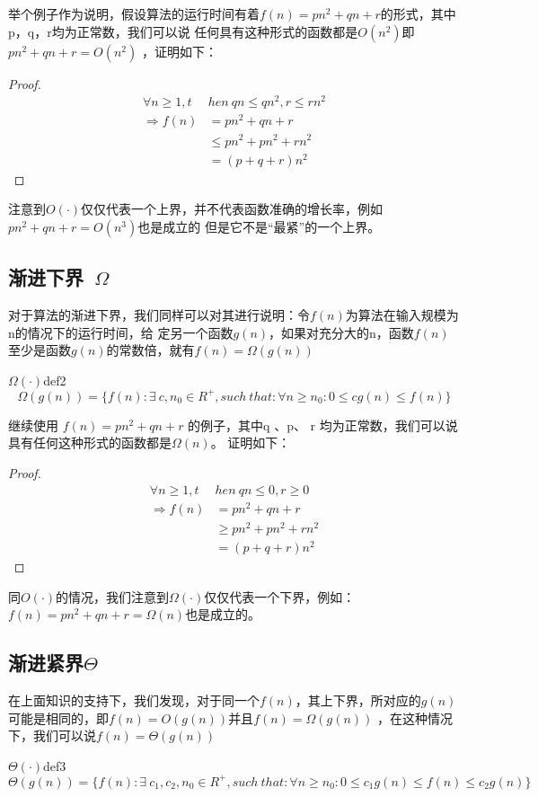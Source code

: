 举个例子作为说明，假设算法的运行时间有着$f(n)=pn^2+qn+r$的形式，其中p，q，r均为正常数，我们可以说
任何具有这种形式的函数都是$O(n^2)$即$pn^2+qn+r=O(n^2)$ ，证明如下：
\begin{proof}
	\begin{align*}
		\forall n \geq 1,t     & hen\ qn\leq qn^2,r\leq rn^2 \\
		\Longrightarrow   f(n) & =pn^2+qn+r                  \\
		                       & \leq pn^2+pn^2+rn^2         \\
		                       & =(p+q+r)n^2
	\end{align*}
\end{proof}
注意到$O(\cdot)$仅仅代表一个上界，并不代表函数准确的增长率，例如$pn^2+qn+r=O(n^3)$也是成立的
但是它不是“最紧”的一个上界。
\subsection{渐进下界\ $\Omega$}
对于算法的渐进下界，我们同样可以对其进行说明：令$f(n)$为算法在输入规模为n的情况下的运行时间，给
定另一个函数$g(n)$，如果对充分大的n，函数$f(n)$至少是函数$g(n)$的常数倍，就有$f(n)=\Omega(g(n))$
\begin{definition}{$\Omega(\cdot)$}{def2}
	\[
		\Omega (g(n))= \{f(n): \exists\ c,n_0\in R^+,such\ that: \forall n\ge n_0:0\le cg(n)\le f(n)\}
	\]
\end{definition}

继续使用 $f(n)=pn^2+qn+r$ 的例子，其中q 、p、 r 均为正常数，我们可以说具有任何这种形式的函数都是$\Omega(n)$。
证明如下：
\begin{proof}
	\begin{align*}
		\forall n \geq 1,t     & hen\ qn\leq 0,r\geq 0 \\
		\Longrightarrow   f(n) & =pn^2+qn+r            \\
		                       & \geq pn^2+pn^2+rn^2   \\
		                       & =(p+q+r)n^2
	\end{align*}
\end{proof}

同$O(\cdot)$的情况，我们注意到$\Omega(\cdot)$仅仅代表一个下界，例如：$f(n)=pn^2+qn+r=\Omega(n)$也是成立的。

\subsection{渐进紧界$\Theta$}
在上面知识的支持下，我们发现，对于同一个$f(n)$，其上下界，所对应的$g(n)$可能是相同的，即$f(n)=O(g(n))$并且$f(n)=\Omega(g(n))$
，在这种情况下，我们可以说$f(n)=\Theta(g(n))$
\begin{definition}{$\Theta(\cdot)$}{def3}
	\[
		\Theta(g(n)) = \{f(n): \exists\ c_1,c_2,n_0\in R^+,such\ that: \forall n\ge n_0:0\le c_1 g(n)\le f(n)\le c_2 g(n)\}
	\]
\end{definition}

